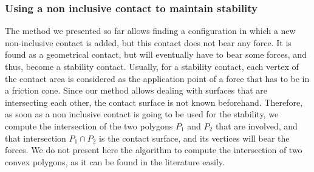 \subsubsection{Using a non inclusive contact to maintain stability}
\label{subsubsec:stability}
The method we presented so far allows finding a configuration in which a new non-inclusive contact is added, but this contact does not bear any force.
It is found as a geometrical contact, but will eventually have to bear some forces, and thus, become a stability contact.
Usually, for a stability contact, each vertex of the contact area is considered as the application point of a force that has to be in a friction cone.
Since our method allows dealing with surfaces that are intersecting each other, the contact surface is not known beforehand.
Therefore, as soon as a non inclusive contact is going to be used for the stability, we compute the intersection of the two polygons $P_1$ and $P_2$ that are involved, and that intersection $P_1 \cap P_2$ is the contact surface, and its vertices will bear the forces.
We do not present here the algorithm to compute the intersection of two convex polygons, as it can be found in the literature easily.

